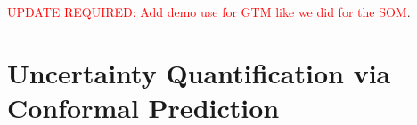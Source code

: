 \textcolor{red}{UPDATE REQUIRED: Add demo use for GTM like we did for the SOM}.









\section{Uncertainty Quantification via Conformal Prediction}

